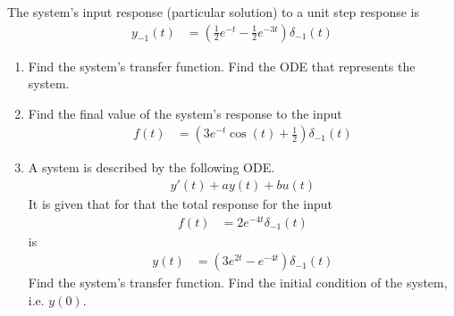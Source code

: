\documentclass[fleqn, a4paper, 11pt, oneside]{amsart}
\theoremstyle{definition}
\theoremstyle{theorem}
\begin{document}
\begin{question}
	The system's input response (particular solution) to a unit step response is
	\begin{align*}
		y_{-1}(t) & = \left( \frac{1}{2} e^{-t} - \frac{1}{2} e^{-3 t} \right) \delta_{-1}(t)
	\end{align*}
	\begin{enumerate}
		\item
			Find the system's transfer function.
			Find the ODE that represents the system.
		\item
			Find the final value of the system's response to the input
			\begin{align*}
				f(t) & = \left( 3 e^{-t} \cos(t) + \frac{1}{2} \right) \delta_{-1}(t)
			\end{align*}
		\item
			A system is described by the following ODE.
			\begin{align*}
				y'(t) + a y(t) + b u(t)
			\end{align*}
			It is given that for that the total response for the input
			\begin{align*}
				f(t) & = 2 e^{-4 t} \delta_{-1}(t)
			\end{align*}
			is
			\begin{align*}
				y(t) & = \left( 3 e^{2 t} - e^{-4 t} \right) \delta_{-1}(t)
			\end{align*}
			Find the system's transfer function.
			Find the initial condition of the system, i.e. $y(0)$.
	\end{enumerate}
\end{question}
\end{document}
